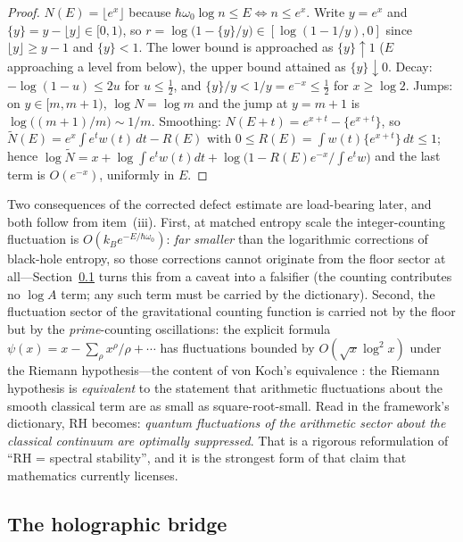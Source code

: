 \begin{proof}
$N(E)=\lfloor e^{x}\rfloor$ because $\hbar\omega_{0}\log n\leq E\iff n\leq e^{x}$. Write
$y=e^{x}$ and $\{y\}=y-\lfloor y\rfloor\in[0,1)$, so $r=\log\bigl(1-\{y\}/y\bigr)\in[\log(1-1/y),0]$
since $\lfloor y\rfloor\geq y-1$ and $\{y\}<1$. The lower bound is approached as $\{y\}\uparrow1$
($E$ approaching a level from below), the upper bound attained as $\{y\}\downarrow0$. Decay:
$-\log(1-u)\leq2u$ for $u\leq\tfrac12$, and $\{y\}/y<1/y=e^{-x}\leq\tfrac12$ for $x\geq\log2$.
Jumps: on $y\in[m,m+1)$, $\log N=\log m$ and the jump at $y=m+1$ is
$\log\bigl((m+1)/m\bigr)\sim1/m$. Smoothing: $N(E+t)=e^{x+t}-\{e^{x+t}\}$, so
$\widetilde N(E)=e^{x}\int e^{t}w(t)\,dt-R(E)$ with $0\leq R(E)=\int w(t)\{e^{x+t}\}\,dt\leq1$;
hence $\log\widetilde N=x+\log\int e^{t}w(t)dt+\log\bigl(1-R(E)e^{-x}/\!\int e^{t}w\bigr)$ and
the last term is $O(e^{-x})$, uniformly in $E$.
\end{proof}

Two consequences of the corrected defect estimate are load-bearing later, and both follow
from item~(iii). First, at matched entropy scale the integer-counting fluctuation is
$O(k_{B}e^{-E/\hbar\omega_{0}})$: \emph{far smaller} than the logarithmic corrections of
black-hole entropy, so those corrections cannot originate from the floor sector at
all---Section~\ref{sec:holography} turns this from a caveat into a falsifier (the counting
contributes no $\log A$ term; any such term must be carried by the dictionary). Second, the
fluctuation sector of the gravitational counting function is carried not by the floor but by
the \emph{prime}-counting oscillations: the explicit formula
$\psi(x)=x-\sum_{\rho}x^{\rho}/\rho+\cdots$ has fluctuations bounded by $O(\sqrt x\log^{2}x)$
under the Riemann hypothesis---the content of von Koch's equivalence
\cite{vonkoch1901}: the Riemann hypothesis is \emph{equivalent} to the statement that
arithmetic fluctuations about the smooth classical term are as small as
square-root-small. Read in the framework's dictionary, RH becomes: \emph{quantum
fluctuations of the arithmetic sector about the classical continuum are optimally
suppressed}. That is a rigorous reformulation of ``RH = spectral
stability'', and it is the strongest form of that claim that mathematics currently
licenses.

\subsection{The holographic bridge}\label{sec:holography}

